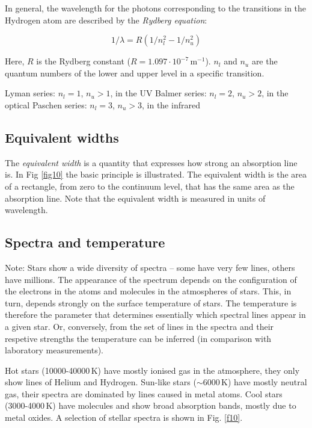 In general, the wavelength for the photons corresponding to the transitions in the Hydrogen atom are described by the \textit{Rydberg equation}:

\begin{equation}
1/\lambda = R (1/n_l^2 - 1/n_u^2)
\label{eq21}
\end{equation}

Here, $R$ is the Rydberg constant ($R = 1.097 \cdot 10^{-7}$\,m$^{-1}$). $n_l$ and $n_u$ are the quantum numbers of the lower and upper level in a specific transition.

Lyman series: $n_l = 1$, $n_u >1$, in the UV
Balmer series: $n_l = 2$, $n_u >2$, in the optical
Paschen series: $n_l = 3$, $n_u >3$, in the infrared

\subsection{Equivalent widths}

The \textit{equivalent width} is a quantity that expresses how strong an absorption line is. In Fig \ref{fig10} the basic principle is illustrated. The equivalent width is the area of a rectangle, from zero to the continuum level, that has the same area as the absorption line. Note that the equivalent width is measured in units of wavelength.

\subsection{Spectra and temperature}

Note: Stars show a wide diversity of spectra -- some have very few lines, others have millions. The appearance of the spectrum depends on the configuration of the electrons in the atoms and molecules in the atmospheres of stars. This, in turn, depends strongly on the surface temperature of stars. The temperature is therefore the parameter that determines essentially which spectral lines appear in a given star. Or, conversely, from the set of lines in the spectra and their respetive strengths the temperature can be inferred (in comparison with laboratory measurements).

Hot stars (10000-40000\,K) have mostly ionised gas in the atmosphere, they only show lines of Helium and Hydrogen. Sun-like stars ($\sim 6000$\,K) have mostly neutral gas, their spectra are dominated by lines caused in metal atoms. Cool stars (3000-4000\,K) have molecules and show broad absorption bands, mostly due to metal oxides. A selection of stellar spectra is shown in Fig. \ref{f10}.

